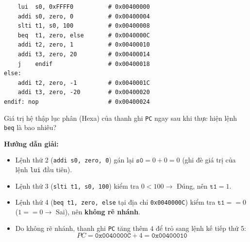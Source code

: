 \noindent\begin{minipage}{\linewidth}
\begin{lstlisting}
    lui  s0, 0xFFFF0          # 0x00400000
    addi s0, zero, 0          # 0x00400004
    slti t1, s0, 100          # 0x00400008
    beq  t1, zero, else       # 0x0040000C
    addi t2, zero, 1          # 0x00400010
    addi t3, zero, 20         # 0x00400014
    j    endif                # 0x00400018
else:
    addi t2, zero, -1         # 0x0040001C
    addi t3, zero, -20        # 0x00400020
endif: nop                    # 0x00400024
\end{lstlisting}
\end{minipage}

Giá trị hệ thập lục phân (Hexa) của thanh ghi \texttt{PC} ngay sau khi thực hiện lệnh \texttt{beq} là bao nhiêu?

\textbf{Hướng dẫn giải:}
\begin{itemize}
    \item Lệnh thứ 2 (\texttt{addi s0, zero, 0}) gán lại $\texttt{s0} = 0 + 0 = 0$ (ghi đè giá trị của lệnh \texttt{lui} đầu tiên).
    \item Lệnh thứ 3 (\texttt{slti t1, s0, 100}) kiểm tra $0 < 100 \rightarrow$ Đúng, nên $\texttt{t1} = 1$.
    \item Lệnh thứ 4 (\texttt{beq t1, zero, else} tại địa chỉ \texttt{0x0040000C}) kiểm tra $\texttt{t1} == 0$ ($1 == 0 \rightarrow$ Sai), nên \textbf{không rẽ nhánh}.
    \item Do không rẽ nhánh, thanh ghi \texttt{PC} tăng thêm $4$ để trỏ sang lệnh kế tiếp thứ 5:
    $$PC = \texttt{0x0040000C} + 4 = \mathbf{\texttt{0x00400010}}$$
\end{itemize}

